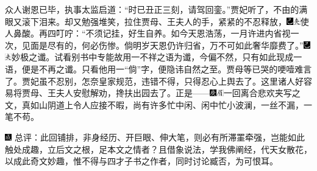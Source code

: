 众人谢恩已毕，执事太监启道：“时已丑正三刻，请驾回銮。”贾妃听了，不由的满眼又滚下泪来。却又勉强堆笑，拉住贾母、王夫人的手，紧紧的不忍释放，{\includegraphics[width=3mm]{../Images/00003}\includegraphics[width=3mm]{../Images/00012}\footnotesize \kaishu 使人鼻酸。}再四叮咛：“不须记挂，好生自养。如今天恩浩荡，一月许进内省视一次，见面是尽有的，何必伤惨。倘明岁天恩仍许归省，万不可如此奢华靡费了。”{\includegraphics[width=3mm]{../Images/00003}\includegraphics[width=3mm]{../Images/00012}\footnotesize \kaishu 妙极之谶。试看别书中专能故用一不祥之语为谶，今偏不然，只有如此现成一语，便是不再之谶。只看他用一“倘”字，便隐讳自然之至。}贾母等已哭的哽噎难言了。贾妃虽不忍别，怎奈皇家规范，违错不得，只得忍心上舆去了。这里诸人好容易将贾母、王夫人安慰解劝，搀扶出园去了。正是------{\includegraphics[width=3mm]{../Images/00004}\includegraphics[width=3mm]{../Images/00010}\footnotesize \kaishu 一回离合悲欢夹写之文，真如山阴道上令人应接不暇，尚有许多忙中闲、闲中忙小波澜，一丝不漏，一笔不苟。}

{\includegraphics[width=3mm]{../Images/00005}  \kaishu 总评：此回铺排，非身经历、开巨眼、伸大笔，则必有所滞罣牵强，岂能如此触处成趣，立后文之根，足本文之情者？且借象说法，学我佛阐经，代天女散花，以成此奇文妙趣，惟不得与四才子书之作者，同时讨论臧否，为可恨耳。}